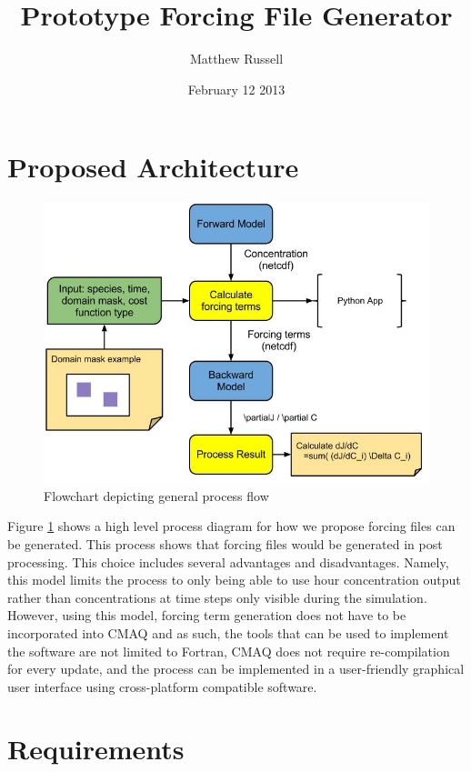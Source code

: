 \documentclass{article}
\title{Prototype Forcing File Generator}
\author{Matthew Russell}
\date{February 12 2013}
\begin{document}
\maketitle

\section{Proposed Architecture}

\begin{figure}
	\centering
	\includegraphics[width=\linewidth]{CMAQ-Adjoint-Process.jpg}
	\caption{Flowchart depicting general process flow}
	\label{process}
\end{figure}

Figure \ref{process} shows a high level process diagram for how we propose
forcing files can be generated.  This process shows that forcing files would be
generated in post processing.  This choice includes several advantages and
disadvantages.  Namely, this model limits the process to only being able to use
hour concentration output rather than concentrations at time steps only visible
during the simulation.  However, using this model, forcing term generation does
not have to be incorporated into CMAQ and as such, the tools that can be used
to implement the software are not limited to Fortran, CMAQ does not require
re-compilation for every update, and the process can be implemented in a
user-friendly graphical user interface using cross-platform compatible
software.

\section{Requirements}
\end{document}
